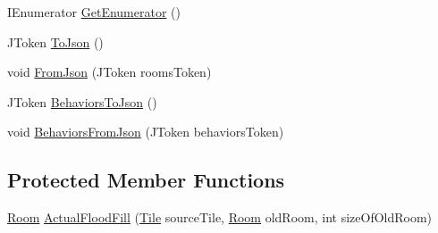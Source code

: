 \begin{DoxyCompactItemize}
I\+Enumerator \hyperlink{class_project_porcupine_1_1_rooms_1_1_room_manager_a2c1e6804f4dcc26cb7f2aec59ddc286b}{Get\+Enumerator} ()
\item 
J\+Token \hyperlink{class_project_porcupine_1_1_rooms_1_1_room_manager_a9f81f33cc998f4f7e3d4d1e05d52196f}{To\+Json} ()
\item 
void \hyperlink{class_project_porcupine_1_1_rooms_1_1_room_manager_a20fabe9e69ef78996cc87aa0ccd69b9e}{From\+Json} (J\+Token rooms\+Token)
\item 
J\+Token \hyperlink{class_project_porcupine_1_1_rooms_1_1_room_manager_a90a95a310c917e67ee16cf47915cc8de}{Behaviors\+To\+Json} ()
\item 
void \hyperlink{class_project_porcupine_1_1_rooms_1_1_room_manager_a7572a579e508d61535cd3270edf906b2}{Behaviors\+From\+Json} (J\+Token behaviors\+Token)
\end{DoxyCompactItemize}
\subsection*{Protected Member Functions}
\begin{DoxyCompactItemize}
\item 
\hyperlink{class_project_porcupine_1_1_rooms_1_1_room}{Room} \hyperlink{class_project_porcupine_1_1_rooms_1_1_room_manager_ab45e75648e69ed59c8e9ccc7a32f1db9}{Actual\+Flood\+Fill} (\hyperlink{class_tile}{Tile} source\+Tile, \hyperlink{class_project_porcupine_1_1_rooms_1_1_room}{Room} old\+Room, int size\+Of\+Old\+Room)
\end{DoxyCompactItemize}
